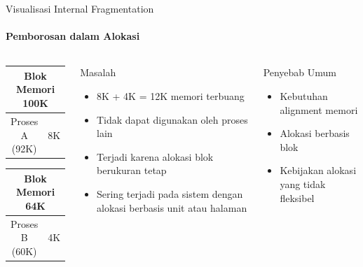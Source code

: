 \documentclass[10pt,aspectratio=169]{beamer}
\begin{document}
\begin{frame}{Visualisasi Internal Fragmentation}
    \framesubtitle{Pemborosan dalam Alokasi}
    
    \begin{columns}[T]
            \begin{center}
                \begin{tabular}{|c|c|}
                \hline
                \multicolumn{2}{|c|}{Blok Memori 100K} \\
                \hline
                \cellcolor{blue!20}Proses A (92K) & \cellcolor{red!20}8K \\
                \hline
                \end{tabular}
                
                \vspace{0.5cm}
                
                \begin{tabular}{|c|c|}
                \hline
                \multicolumn{2}{|c|}{Blok Memori 64K} \\
                \hline
                \cellcolor{blue!20}Proses B (60K) & \cellcolor{red!20}4K \\
                \hline
                \end{tabular}
            \end{center}
            
            \begin{alertblock}{Masalah}
                \begin{itemize}
                    \item 8K + 4K = 12K memori terbuang
                    \item Tidak dapat digunakan oleh proses lain
                    \item Terjadi karena alokasi blok berukuran tetap
                    \item Sering terjadi pada sistem dengan alokasi berbasis unit atau halaman
                \end{itemize}
            \end{alertblock}
            
            \begin{block}{Penyebab Umum}
                \begin{itemize}
                    \item Kebutuhan alignment memori
                    \item Alokasi berbasis blok
                    \item Kebijakan alokasi yang tidak fleksibel
                \end{itemize}
            \end{block}
    \end{columns}
\end{frame}
\end{document}
